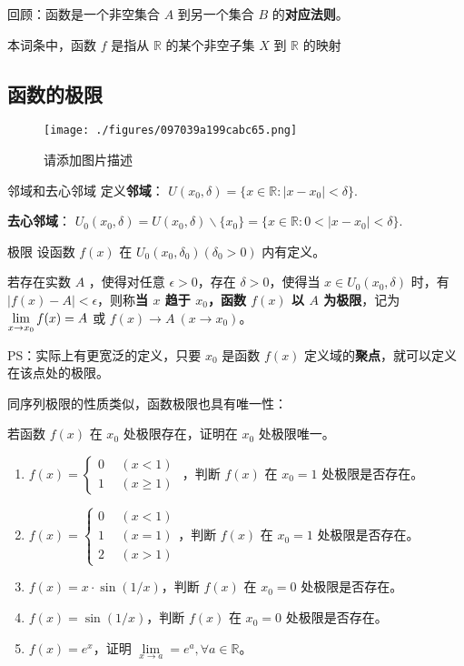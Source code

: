 

回顾：函数是一个非空集合 $A$ 到另一个集合 $B$ 的\textbf{对应法则}。

本词条中，函数 $f$ 是指从 $\mathbb R$ 的某个非空子集 $X$ 到 $\mathbb{R}$ 的映射  

\subsection{函数的极限}
\begin{figure}[ht]
\centering
\texttt{[image: ./figures/097039a199cabc65.png]}
\caption{请添加图片描述} \label{fig_limfx_1}
\end{figure}
\begin{definition}{邻域和去心邻域}
  定义\textbf{邻域}： $U(x_0,\delta)=\{x\in \mathbb{R}:|x-x_0|<\delta\}$.

  \textbf{去心邻域}： $U_0(x_0,\delta)= U(x_0,\delta) \backslash \{x_0\}=\{x\in \mathbb{R}:0<|x-x_0|<\delta\}$.
\end{definition}
\begin{definition}{极限}
 设函数 $f(x)$ 在 $U_0(x_0,\delta_0)(\delta_0>0)$ 内有定义。

  若存在实数 $A$ ，使得对任意 $\epsilon >0$，存在 $\delta>0$，使得当 $x\in U_0(x_0,\delta)$ 时，有 $|f(x)-A|<\epsilon$，则称\textbf{当 $x$ 趋于 $x_0$，函数 $f(x)$ 以 $A$ 为极限}，记为 $\large \lim\limits_{x\rightarrow x_0}f(x)=A$ 或 $f(x)\rightarrow A\ (x\rightarrow x_0)$。
\end{definition}
PS：实际上有更宽泛的定义，只要 $x_0$ 是函数 $f(x)$ 定义域的\textbf{聚点}，就可以定义在该点处的极限。

同序列极限的性质类似，函数极限也具有唯一性：
\begin{theorem}{}
  若函数 $f(x)$ 在 $x_0$ 处极限存在，证明在 $x_0$ 处极限唯一。
\end{theorem}
\begin{exercise}{}
\begin{enumerate}
\item  $f(x)=\left\{\begin{aligned} 0\ \ &(x<1)\\ 1\ \ &(x\ge 1) \end{aligned}\right.$ ，判断 $f(x)$ 在 $x_0=1$ 处极限是否存在。
\item $f(x)=\left\{\begin{aligned} 0\ \ &(x<1)\\ 1\ \ &(x= 1)\\2\ \ &(x>1) \end{aligned}\right.$，判断 $f(x)$ 在 $x_0=1$ 处极限是否存在。
\item $f(x)=x\cdot \sin(1/x)$，判断 $f(x)$ 在 $x_0=0$ 处极限是否存在。
\item $f(x)=\sin(1/x)$，判断 $f(x)$ 在 $x_0=0$ 处极限是否存在。
\item $f(x)=e^x$，证明 $\lim\limits_{x\rightarrow a}=e^a,\forall a\in\mathbb{R}$。
\end{enumerate}
\end{exercise}

